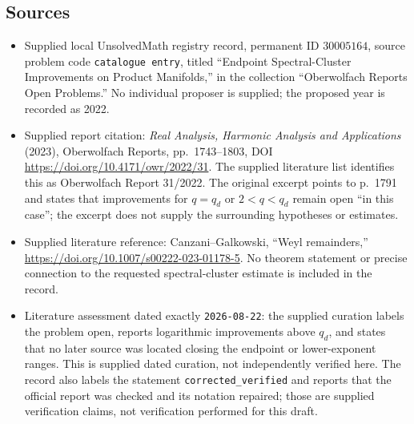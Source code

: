 \documentclass[11pt]{article}
\begin{document}
\subsection{Sources}
\begin{itemize}
\item Supplied local UnsolvedMath registry record, permanent ID \(30005164\), source problem code \texttt{catalogue entry}, titled ``Endpoint Spectral-Cluster Improvements on Product Manifolds,'' in the collection ``Oberwolfach Reports Open Problems.'' No individual proposer is supplied; the proposed year is recorded as 2022.
\item Supplied report citation: \emph{Real Analysis, Harmonic Analysis and Applications} (2023), Oberwolfach Reports, pp.\ 1743--1803, DOI \url{https://doi.org/10.4171/owr/2022/31}. The supplied literature list identifies this as Oberwolfach Report 31/2022. The original excerpt points to p.\ 1791 and states that improvements for \(q=q_d\) or \(2<q<q_d\) remain open ``in this case''; the excerpt does not supply the surrounding hypotheses or estimates.
\item Supplied literature reference: Canzani--Galkowski, ``Weyl remainders,'' \url{https://doi.org/10.1007/s00222-023-01178-5}. No theorem statement or precise connection to the requested spectral-cluster estimate is included in the record.
\item Literature assessment dated exactly \texttt{2026-08-22}: the supplied curation labels the problem open, reports logarithmic improvements above \(q_d\), and states that no later source was located closing the endpoint or lower-exponent ranges. This is supplied dated curation, not independently verified here. The record also labels the statement \texttt{corrected\_verified} and reports that the official report was checked and its notation repaired; those are supplied verification claims, not verification performed for this draft.
\end{itemize}
\end{document}
